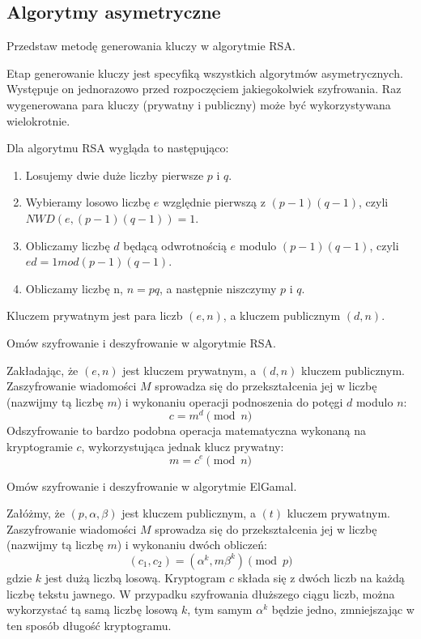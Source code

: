 \documentclass[answers,11pt]{exam}
\begin{document}
\subsection{Algorytmy asymetryczne}

\begin{questions}
\question Przedstaw metodę generowania kluczy w algorytmie RSA.
\begin{solution}
Etap generowanie kluczy jest specyfiką wszystkich algorytmów asymetrycznych. Występuje on jednorazowo przed rozpoczęciem jakiegokolwiek szyfrowania. Raz wygenerowana para kluczy (prywatny i publiczny) może być wykorzystywana wielokrotnie. 

Dla algorytmu RSA wygląda to następująco:
\begin{enumerate}
\item Losujemy dwie duże liczby pierwsze $p$ i $q$.
\item Wybieramy losowo liczbę $e$ względnie pierwszą z $(p-1)(q-1)$, czyli $NWD(e, (p-1)(q-1)) = 1$.
\item Obliczamy liczbę $d$ będącą odwrotnością $e$ modulo $(p-1)(q-1)$, czyli $ ed = 1 mod (p-1)(q-1)$.
\item Obliczamy liczbę n, $n = pq$, a następnie niszczymy $p$ i $q$. 
\end{enumerate}
Kluczem prywatnym jest para liczb $(e,n)$, a kluczem publicznym $(d,n)$.
\end{solution}

\question Omów szyfrowanie i deszyfrowanie w algorytmie RSA.
\begin{solution}
Zakładając, że $(e,n)$ jest kluczem prywatnym, a $(d,n)$ kluczem publicznym. Zaszyfrowanie wiadomości $M$ sprowadza się do przekształcenia jej w liczbę (nazwijmy tą liczbę $m$) i wykonaniu operacji podnoszenia do potęgi $d$ modulo $n$:
\begin{equation}
 c = m^d \pmod{n}
\end{equation}
Odszyfrowanie to bardzo podobna operacja matematyczna wykonaną na kryptogramie $c$, wykorzystująca jednak klucz prywatny:
\begin{equation}
 m = c^e \pmod{n}
\end{equation}
\end{solution}

\question Omów szyfrowanie i deszyfrowanie w algorytmie ElGamal.
\begin{solution}
Załóżmy, że $(p,\alpha,\beta)$ jest kluczem publicznym, a $(t)$ kluczem prywatnym. Zaszyfrowanie wiadomości $M$ sprowadza się do przekształcenia jej w liczbę (nazwijmy tą liczbę $m$) i wykonaniu dwóch obliczeń:
\begin{equation}
 (c_1, c_2) = (\alpha^k, m\beta^k) \pmod{p}
\end{equation}
gdzie $k$ jest dużą liczbą losową. Kryptogram $c$ składa się z dwóch liczb na każdą liczbę tekstu jawnego. W przypadku szyfrowania dłuższego ciągu liczb, można wykorzystać tą samą liczbę losową $k$, tym samym $\alpha^k$ będzie jedno, zmniejszając w ten sposób długość kryptogramu.
  

\end{solution}
\end{questions}
\end{document}
